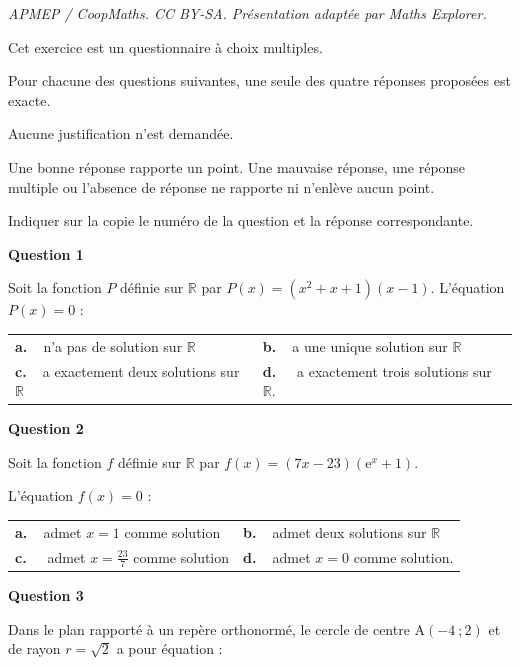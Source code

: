\documentclass[10pt]{article}
\providecommand{\R}{\mathbb{R}}
\providecommand{\e}{{\mathrm{e}}}
\begin{document}
\noindent\textit{APMEP / CoopMaths. CC BY-SA. Présentation adaptée par Maths Explorer.}\par\medskip
\medskip

Cet exercice est un questionnaire à choix multiples.

Pour chacune des questions suivantes, une seule des quatre réponses proposées est exacte. 

Aucune justification n'est demandée.

Une bonne réponse rapporte un point. Une mauvaise réponse, une réponse multiple ou l'absence de réponse ne rapporte ni n'enlève aucun point.

Indiquer sur la copie le numéro de la question et la réponse correspondante.

\medskip

\textbf{Question 1}

\medskip 

Soit la fonction $P$ définie sur $\R$ par $P(x)=(x^2+x+1)(x-1)$.
L'équation $P(x)=0$ :

\medskip

\begin{tabularx}{\linewidth}{*{2}{X}}
\textbf{a.~~}n'a pas de solution sur $\R$ &\textbf{b.~~}a une unique solution sur $\R$ \\\textbf{c.~~}a exactement deux solutions sur $\R$& \textbf{d.~~} a exactement trois solutions sur $\R$.
\end{tabularx}

\medskip

\textbf{Question 2}

\medskip 

Soit la fonction $f$ définie sur $\R$ par $f(x) = (7x - 23)\left(\e^x+1\right)$.

L'équation $f(x)=0$ :

\medskip

\begin{tabularx}{\linewidth}{*{2}{X}}
\textbf{a.~~}admet $x=1$ comme solution &\textbf{b.~~}admet deux solutions sur $\R $\\\textbf{c.~~} admet $x=\frac{23}{7}$ comme solution & \textbf{d.~~}admet $x=0$ comme solution.
\end{tabularx}


\medskip

\textbf{Question 3}

\medskip 

Dans le plan rapporté à un repère orthonormé, le cercle de centre A$(-4~;2)$ et de rayon $r=\sqrt{2}$ a pour équation :
\end{document}
